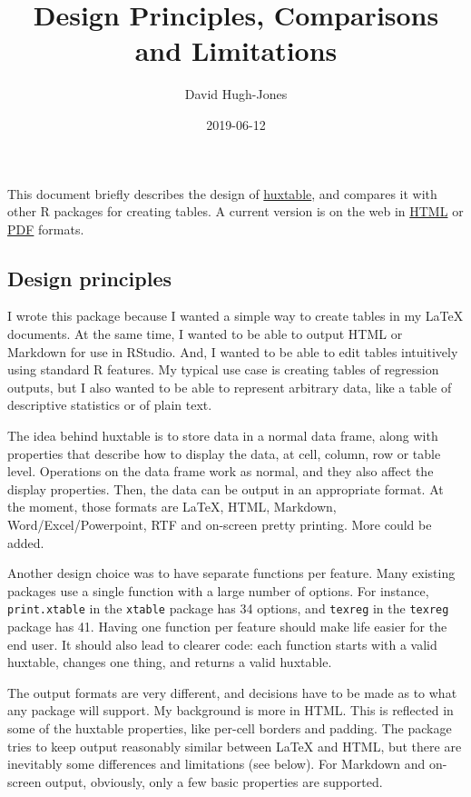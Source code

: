 \documentclass[]{article}
\title{Design Principles, Comparisons and Limitations}
\author{David Hugh-Jones}
\date{2019-06-12}
\begin{document}
\maketitle

This document briefly describes the design of
\href{https://hughjonesd.github.io/huxtable}{huxtable}, and compares it
with other R packages for creating tables. A current version is on the
web in
\href{http://hughjonesd.github.io/huxtable/design-principles.html}{HTML}
or
\href{http://hughjonesd.github.io/huxtable/design-principles.pdf}{PDF}
formats.

\hypertarget{design-principles}{%
\subsection{Design principles}\label{design-principles}}

I wrote this package because I wanted a simple way to create tables in
my LaTeX documents. At the same time, I wanted to be able to output HTML
or Markdown for use in RStudio. And, I wanted to be able to edit tables
intuitively using standard R features. My typical use case is creating
tables of regression outputs, but I also wanted to be able to represent
arbitrary data, like a table of descriptive statistics or of plain text.

The idea behind huxtable is to store data in a normal data frame, along
with properties that describe how to display the data, at cell, column,
row or table level. Operations on the data frame work as normal, and
they also affect the display properties. Then, the data can be output in
an appropriate format. At the moment, those formats are LaTeX, HTML,
Markdown, Word/Excel/Powerpoint, RTF and on-screen pretty printing. More
could be added.

Another design choice was to have separate functions per feature. Many
existing packages use a single function with a large number of options.
For instance, \texttt{print.xtable} in the \texttt{xtable} package has
34 options, and \texttt{texreg} in the \texttt{texreg} package has 41.
Having one function per feature should make life easier for the end
user. It should also lead to clearer code: each function starts with a
valid huxtable, changes one thing, and returns a valid huxtable.

The output formats are very different, and decisions have to be made as
to what any package will support. My background is more in HTML. This is
reflected in some of the huxtable properties, like per-cell borders and
padding. The package tries to keep output reasonably similar between
LaTeX and HTML, but there are inevitably some differences and
limitations (see below). For Markdown and on-screen output, obviously,
only a few basic properties are supported.
\end{document}
